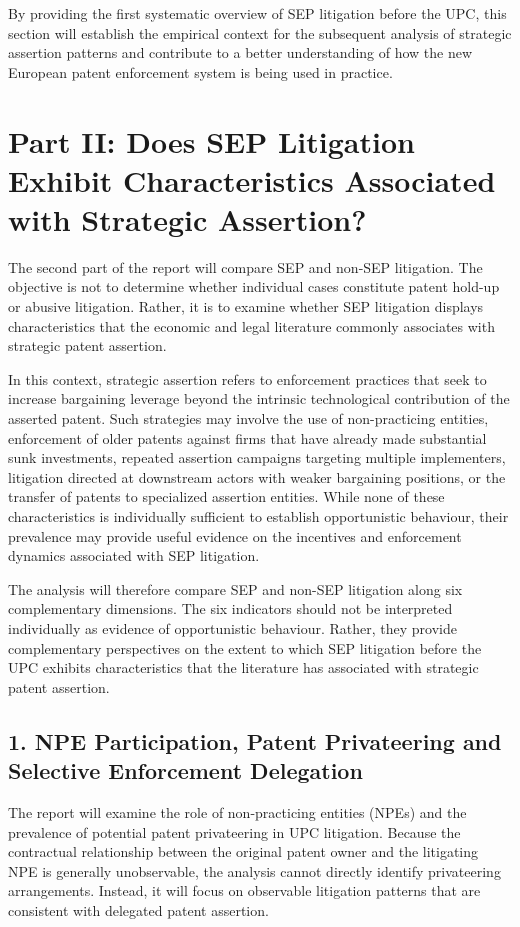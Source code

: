 \documentclass[12pt]{article}
\begin{document}
By providing the first systematic overview of SEP litigation before the UPC, this section will establish the empirical context for the subsequent analysis of strategic assertion patterns and contribute to a better understanding of how the new European patent enforcement system is being used in practice.


\section*{Part II: Does SEP Litigation Exhibit Characteristics Associated with Strategic Assertion?}

The second part of the report will compare SEP and non-SEP litigation. The objective is not to determine whether individual cases constitute patent hold-up or abusive litigation. Rather, it is to examine whether SEP litigation displays characteristics that the economic and legal literature commonly associates with strategic patent assertion.

In this context, strategic assertion refers to enforcement practices that seek to increase bargaining leverage beyond the intrinsic technological contribution of the asserted patent. Such strategies may involve the use of non-practicing entities, enforcement of older patents against firms that have already made substantial sunk investments, repeated assertion campaigns targeting multiple implementers, litigation directed at downstream actors with weaker bargaining positions, or the transfer of patents to specialized assertion entities. While none of these characteristics is individually sufficient to establish opportunistic behaviour, their prevalence may provide useful evidence on the incentives and enforcement dynamics associated with SEP litigation.

The analysis will therefore compare SEP and non-SEP litigation along six complementary dimensions. The six indicators should not be interpreted individually as evidence of opportunistic behaviour. Rather, they provide complementary perspectives on the extent to which SEP litigation before the UPC exhibits characteristics that the literature has associated with strategic patent assertion.


\subsection*{1. NPE Participation, Patent Privateering and Selective Enforcement Delegation}

The report will examine the role of non-practicing entities (NPEs) and the prevalence of potential patent privateering in UPC litigation. Because the contractual relationship between the original patent owner and the litigating NPE is generally unobservable, the analysis cannot directly identify privateering arrangements. Instead, it will focus on observable litigation patterns that are consistent with delegated patent assertion.
\end{document}
